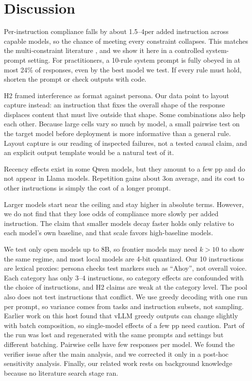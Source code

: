 \section{Discussion}
\label{sec:discussion}

 Per-instruction compliance falls by about 1.5--4\pp per added instruction across capable models, so the chance of meeting every constraint collapses. This matches the multi-constraint literature \citep{harada2025multiply}, and we show it here in a controlled system-prompt setting. For practitioners, a 10-rule system prompt is fully obeyed in at most 24\% of responses, even by the best model we test. If every rule must hold, shorten the prompt or check outputs with code.

 H2 framed interference as format against persona. Our data point to layout capture instead: an instruction that fixes the overall shape of the response displaces content that must live outside that shape. Some combinations also help each other. Because large cells vary so much by model, a small pairwise test on the target model before deployment is more informative than a general rule. Layout capture is our reading of inspected failures, not a tested causal claim, and an explicit output template would be a natural test of it.

 Recency effects exist in some Qwen models, but they amount to a few pp and do not appear in Llama models. Repetition gains about 3\pp on average, and its cost to other instructions is simply the cost of a longer prompt.

 Larger models start near the ceiling and stay higher in absolute terms. However, we do not find that they lose odds of compliance more slowly per added instruction. The claim that smaller models decay faster holds only relative to each model's own baseline, and that scale favors high-baseline models.

 We test only open models up to 8B, so frontier models may need $k>10$ to show the same regime, and most local models are 4-bit quantized. Our 10 instructions are lexical proxies: persona checks test markers such as ``Ahoy'', not overall voice. Each category has only 3--4 instructions, so category effects are confounded with the choice of instructions, and H2 claims are weak at the category level. The pool also does not test instructions that conflict. We use greedy decoding with one run per prompt, so variance comes from tasks and instruction subsets, not sampling. Earlier work on this host found that vLLM greedy outputs can change slightly with batch composition, so single-model effects of a few pp need caution. Part of the \qseven run was lost and regenerated with the same prompts and settings but different batching. Pairwise cells have few responses per model. We found the  verifier issue after the main analysis, and we corrected it only in a post-hoc sensitivity analysis. Finally, our related work rests on background knowledge because no literature search stage ran.

